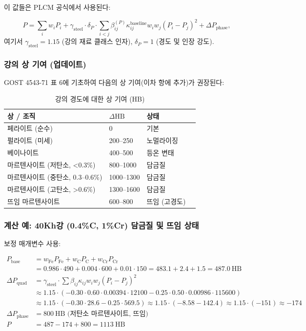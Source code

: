 \documentclass[12pt,a4paper]{article}
\begin{document}
	이 값들은 PLCM 공식에서 사용된다:
	
	\[
	P = \sum_i w_i P_i + \gamma_{\text{steel}} \cdot \delta_P \cdot \sum_{i<j} \beta_{ij}^{(P)} \kappa_{ij}^{\text{baseline}} w_i w_j (P_i - P_j)^2 + \Delta P_{\text{phase}},
	\]
	여기서 $\gamma_{\text{steel}} = 1.15$ (강의 재료 클래스 인자), $\delta_P = 1$ (경도 및 인장 강도).
	
	\subsubsection{강의 상 기여 (업데이트)}
	
	GOST 4543-71 표 6에 기초하여 다음의 상 기여(이차 항에 추가)가 권장된다:
	
	\begin{longtable}{p{3.5cm} p{3.0cm} p{3.0cm} p{4cm}}
		\caption{강의 경도에 대한 상 기여 (HB)}\label{tab:steel_phase_contrib_gost4543}\\
		\toprule
		\textbf{상 / 조직} & $\Delta\text{HB}$ & \textbf{상태} \\
		\midrule
		페라이트 (순수) & 0 & 기본 \\
		펄라이트 (미세) & 200–250 & 노멀라이징 \\
		베이나이트 & 400–500 & 등온 변태 \\
		마르텐사이트 (저탄소, <0.3\%) & 800–1000 & 담금질 \\
		마르텐사이트 (중탄소, 0.3–0.6\%) & 1000–1300 & 담금질 \\
		마르텐사이트 (고탄소, >0.6\%) & 1300–1600 & 담금질 \\
		뜨임 마르텐사이트 & 600–800 & 뜨임 (고경도) \\
		\bottomrule
	\end{longtable}
	
	\subsubsection{계산 예: 40Kh강 (0.4\%C, 1\%Cr) 담금질 및 뜨임 상태}
	
	보정 매개변수 사용:
	
	\[
	\begin{aligned}
		P_{\text{base}} &= w_{\text{Fe}} P_{\text{Fe}} + w_{\text{C}} P_{\text{C}} + w_{\text{Cr}} P_{\text{Cr}} \\
		&= 0.986\cdot490 + 0.004\cdot600 + 0.01\cdot150 = 483.1 + 2.4 + 1.5 = 487.0\ \text{HB} \\
		\Delta P_{\text{quad}} &= \gamma_{\text{steel}} \cdot \sum \beta_{ij} \kappa_{ij} w_i w_j (P_i-P_j)^2 \\
		&\approx 1.15 \cdot ( -0.30 \cdot 0.60 \cdot 0.00394 \cdot 12100 -0.25 \cdot 0.50 \cdot 0.00986 \cdot 115600 ) \\
		&\approx 1.15 \cdot ( -0.30 \cdot 28.6 -0.25 \cdot 569.5 ) \approx 1.15 \cdot ( -8.58 -142.4 ) \approx 1.15 \cdot (-151) \approx -174 \\
		\Delta P_{\text{phase}} &= 800\ \text{HB (저탄소 마르텐사이트, 뜨임)} \\
		P &= 487 - 174 + 800 = 1113\ \text{HB}
	\end{aligned}
	\]
	
\end{document}
